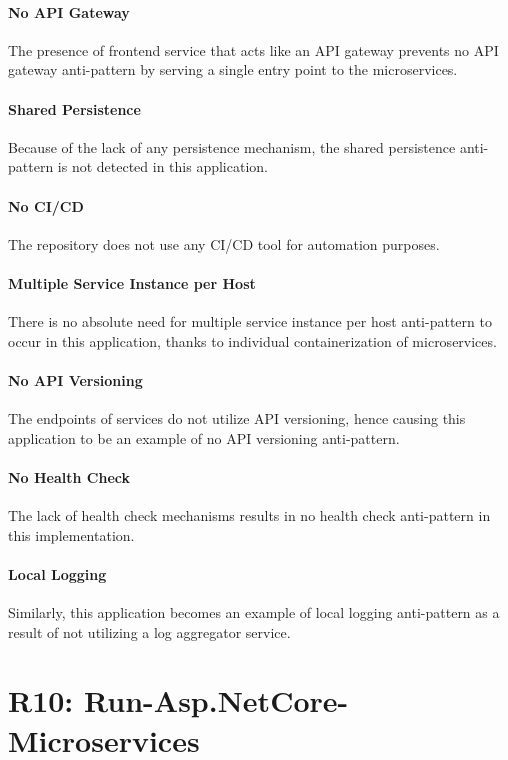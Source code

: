 \documentclass{Configuration_Files/PoliMi3i_thesis}
\begin{document}
\paragraph{No API Gateway} The presence of frontend service that acts like an API gateway prevents no API gateway anti-pattern by serving a single entry point to the microservices.

\paragraph{Shared Persistence} Because of the lack of any persistence mechanism, the shared persistence anti-pattern is not detected in this application.

\paragraph{No CI/CD} The repository does not use any CI/CD tool for automation purposes.

\paragraph{Multiple Service Instance per Host} There is no absolute need for multiple service instance per host anti-pattern to occur in this application, thanks to individual containerization of microservices.

\paragraph{No API Versioning} The endpoints of services do not utilize API versioning, hence causing this application to be an example of no API versioning anti-pattern.

\paragraph{No Health Check} The lack of health check mechanisms results in no health check anti-pattern in this implementation.

\paragraph{Local Logging} Similarly, this application becomes an example of local logging anti-pattern as a result of not utilizing a log aggregator service.

\section{R10: Run-Asp.NetCore-Microservices}
\label{sec:R10}
\end{document}
